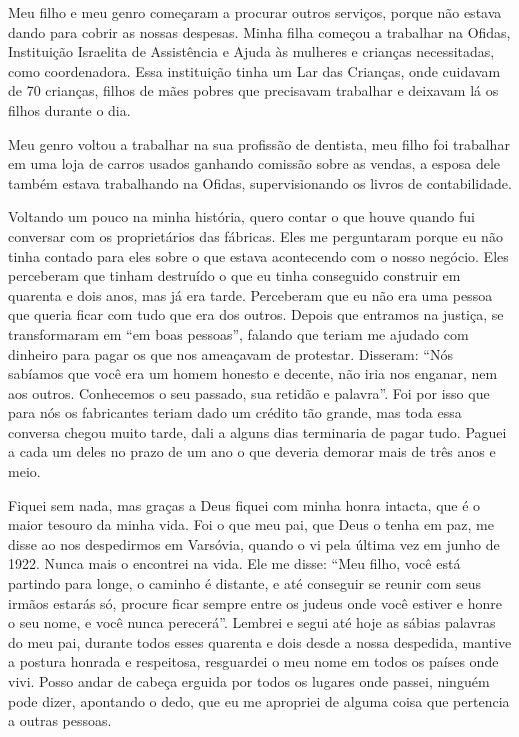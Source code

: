 Meu filho e meu genro começaram a procurar outros serviços, porque não
estava dando para cobrir as nossas despesas. Minha filha começou a
trabalhar na Ofidas, Instituição Israelita de Assistência e Ajuda às
mulheres e crianças necessitadas, como coordenadora. Essa instituição
tinha um Lar das Crianças, onde cuidavam de 70 crianças, filhos de mães
pobres que precisavam trabalhar e deixavam lá os filhos durante o dia.

Meu genro voltou a trabalhar na sua profissão de dentista, meu filho foi
trabalhar em uma loja de carros usados ganhando comissão sobre as
vendas, a esposa dele também estava trabalhando na Ofidas,
supervisionando os livros de contabilidade.

Voltando um pouco na minha história, quero contar o que houve quando fui
conversar com os proprietários das fábricas. Eles me perguntaram porque
eu não tinha contado para eles sobre o que estava acontecendo com o
nosso negócio. Eles perceberam que tinham destruído o que eu tinha
conseguido construir em quarenta e dois anos, mas já era tarde.
Perceberam que eu não era uma pessoa que queria ficar com tudo que era
dos outros. Depois que entramos na justiça, se transformaram em ``em
boas pessoas'', falando que teriam me ajudado com dinheiro para pagar os
que nos ameaçavam de protestar. Disseram: ``Nós sabíamos que você era um
homem honesto e decente, não iria nos enganar, nem aos outros.
Conhecemos o seu passado, sua retidão e palavra''. Foi por isso que para
nós os fabricantes teriam dado um crédito tão grande, mas toda essa
conversa chegou muito tarde, dali a alguns dias terminaria de pagar
tudo. Paguei a cada um deles no prazo de um ano o que deveria demorar
mais de três anos e meio.

Fiquei sem nada, mas graças a Deus fiquei com minha honra intacta, que é
o maior tesouro da minha vida. Foi o que meu pai, que Deus o tenha em
paz, me disse ao nos despedirmos em Varsóvia, quando o vi pela última
vez em junho de 1922. Nunca mais o encontrei na vida. Ele me disse:
``Meu filho, você está partindo para longe, o caminho é distante, e até
conseguir se reunir com seus irmãos estarás só, procure ficar sempre
entre os judeus onde você estiver e honre o seu nome, e você nunca
perecerá''. Lembrei e segui até hoje as sábias palavras do meu pai,
durante todos esses quarenta e dois desde a nossa despedida, mantive a
postura honrada e respeitosa, resguardei o meu nome em todos os países
onde vivi. Posso andar de cabeça erguida por todos os lugares onde
passei, ninguém pode dizer, apontando o dedo, que eu me apropriei de
alguma coisa que pertencia a outras pessoas.
